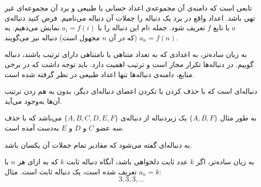 \begin{DEFINITION}
	\p
{}
تابعی است که دامنه‌ی آن مجموعه‌ی اعداد حسابی یا طبیعی و برد آن مجموعه‌ای غیر تهی باشد.
اعداد واقع در برد یک دنباله را جملات آن دنباله می‌نامیم.
فرض کنید دنباله‌ی
$a$
با تابع
$f$
تعریف شود.
جمله
$i$ام
این دنباله را با
$a_i = f(i)$
نمایش می‌دهیم.
به 
$a_n = f(n)$
(که در آن $n$ مجهول است)
دنباله نیز می‌گویند.
\end{DEFINITION}

\p
به زبان ساده‌تر، به اعدادی که به تعداد متناهی یا نامتناهی دارای ترتیب باشند، دنباله
گوییم. در دنباله‌ها تکرار مجاز است و ترتیب اهمیت دارد.
باید توجه داشت که در برخی منابع، دامنه‌ی دنباله‌ها تنها اعداد طبیعی در نظر گرفته شده است.

\begin{DEFINITION}
\p
دنباله‌ای است که با حذف کردن یا نکردن اعضای دنباله‌ای دیگر، بدون به هم زدن ترتیب آن‌ها به‌وجود می‌آید.
\end{DEFINITION}
\p
به طور مثال
$\{A, B, F\}$
یک زیردنباله از دنباله‌ی
$\{A, B, C, D, E, F\}$
می‌باشد که با حذف سه عضو 
$C$
و
$D$
و
$E$
به‌دست آمده است.








\begin{DEFINITION}
  \p
  به دنباله‌ای گفته می‌شود که مقادیر تمام جملات آن یکسان باشد.
\end{DEFINITION}

\p
به زبان ساده‌تر، اگر
$k$
عدد ثابت دلخواهی باشد، آنگاه دنباله ثابت 
$k$
که به ازای هر 
$n$
با 
$a_n = k$
تعریف شده است، 
یک دنباله ثابت است.
مثال:
$$3, 3, 3, ...$$

